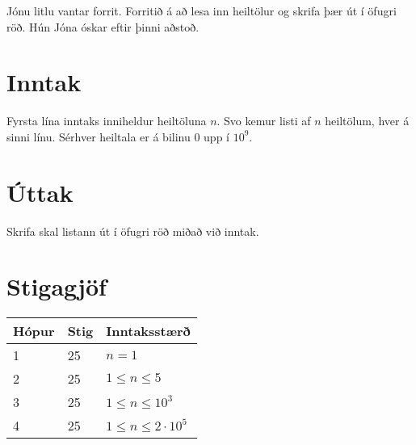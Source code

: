 
Jónu litlu vantar forrit.
Forritið á að lesa inn heiltölur og skrifa þær út í öfugri röð.
Hún Jóna óskar eftir þinni aðstoð.

\section*{Inntak}
Fyrsta lína inntaks inniheldur heiltöluna $n$.
Svo kemur listi af $n$ heiltölum, hver á sinni línu.
Sérhver heiltala er á bilinu $0$ upp í $10^9$.

\section*{Úttak}
Skrifa skal listann út í öfugri röð miðað við inntak.

\section*{Stigagjöf}
\begin{tabular}{|l|l|l|}
\hline
Hópur & Stig & Inntaksstærð  \\ \hline
1     & 25         & $n = 1$ \\ \hline
2     & 25         & $1 \leq n \leq 5 $ \\ \hline
3     & 25         & $1 \leq n \leq 10^{3} $ \\ \hline
4     & 25         & $1 \leq n \leq 2 \cdot 10^{5} $ \\ \hline
\end{tabular}
